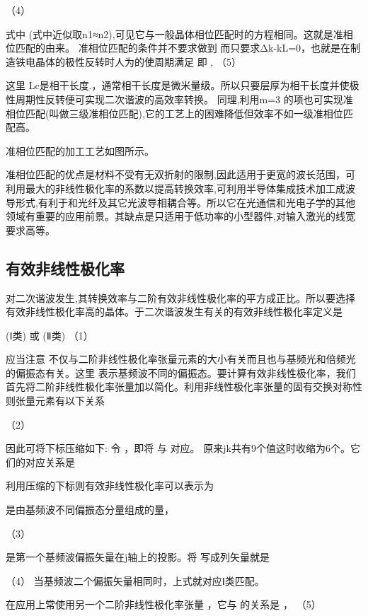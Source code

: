                                              （4）

式中 (式中近似取n1≈n2),可见它与一般晶体相位匹配时的方程相同。这就是准相位匹配的由来。 准相位匹配的条件并不要求做到 而只要求Δk-kL=0，也就是在制造铁电晶体的极性反转时人为的使周期满足
                  即 ,                                      （5）

这里  Lc是相干长度.，通常相干长度是微米量级。所以只要层厚为相干长度并使极性周期性反转便可实现二次谐波的高效率转换。 同理,利用m=3 的项也可实现准相位匹配(叫做三级准相位匹配),它的工艺上的困难降低但效率不如一级准相位匹配高。

准相位匹配的加工工艺如图所示。

准相位匹配的优点是材料不受有无双折射的限制,因此适用于更宽的波长范围，可利用最大的非线性极化率的系数以提高转换效率,可利用半导体集成技术加工成波导形式,有利于和光纤及其它光波导相耦合等。所以它在光通信和光电子学的其他领域有重要的应用前景。其缺点是只适用于低功率的小型器件,对输入激光的线宽要求高等。

\subsection{有效非线性极化率}
对二次谐波发生,其转换效率与二阶有效非线性极化率的平方成正比。所以要选择有效非线性极化率高的晶体。于二次谐波发生有关的有效非线性极化率定义是

  (Ⅰ类) 
或  (Ⅱ类)           （1）

应当注意 不仅与二阶非线性极化率张量元素的大小有关而且也与基频光和倍频光的偏振态有关。这里 表示基频波不同的偏振态。要计算有效非线性极化率，我们首先将二阶非线性极化率张量加以简化。利用非线性极化率张量的固有交换对称性则张量元素有以下关系

                    （2）

因此可将下标压缩如下: 令 ，即将 与 对应。 原来jk共有9个值这时收缩为6个。它们的对应关系是
     
利用压缩的下标则有效非线性极化率可以表示为
           
 是由基频波不同偏振态分量组成的量，

     （3）                   

 是第一个基频波偏振矢量在j轴上的投影。将 写成列矢量就是

                                                  （4）                                                      
当基频波二个偏振矢量相同时，上式就对应Ⅰ类匹配。

在应用上常使用另一个二阶非线性极化率张量 ，它与 的关系是
 ，                                        （5）

